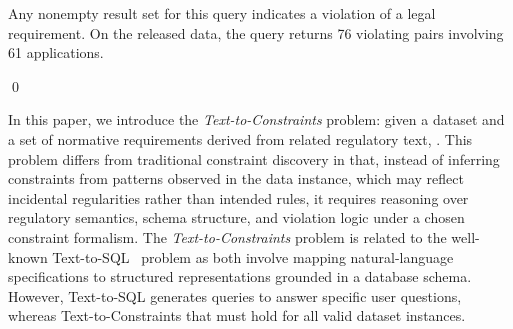 \begin{example}
Any nonempty result set for this query indicates a violation of a legal requirement. On the released data, the query returns 76 violating pairs involving 61 applications.

\qed
\end{example}




In this paper, we introduce the \emph{Text-to-Constraints} problem: given a dataset and a set of normative requirements derived from related regulatory text, .  This problem differs from traditional constraint discovery in that, instead of inferring constraints from patterns observed in the data instance, which may reflect incidental regularities rather than intended rules, it requires reasoning over regulatory semantics, schema structure, and violation logic under a chosen constraint formalism. The \emph{Text-to-Constraints} problem is related to the well-known Text-to-SQL~\cite{llmTEXT2SQLSurvey2025} problem as both involve mapping natural-language specifications to structured representations grounded in a database schema. However, Text-to-SQL generates queries to answer specific user questions,  whereas Text-to-Constraints  that must hold for all valid dataset instances.  %


